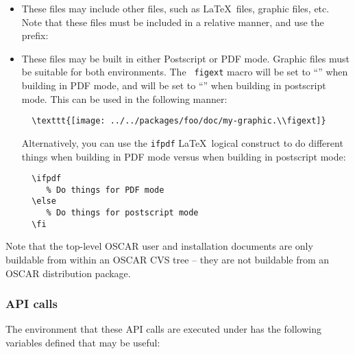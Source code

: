 \begin{itemize}
\item These files may include other files, such as \LaTeX\ files,
  graphic files, etc.  Note that these files must be included in a
  relative manner, and use the prefix: 

  \vspace{10pt}
  \centerline{}
  
\item These files may be built in either Postscript or PDF mode.
  Graphic files must be suitable for both environments.  The {\tt
    figext} macro will be set to ``'' when building in PDF
  mode, and will be set to ``'' when building in postscript
  mode.  This can be used in the following manner:

\begin{verbatim}
  \texttt{[image: ../../packages/foo/doc/my-graphic.\\figext]}
\end{verbatim}
  
  Alternatively, you can use the {\tt ifpdf} \LaTeX\ logical construct
  to do different things when building in PDF mode versus when
  building in postscript mode:

\begin{verbatim}
  \ifpdf
     % Do things for PDF mode
  \else
     % Do things for postscript mode
  \fi
\end{verbatim}

\end{itemize}

Note that the top-level OSCAR user and installation documents are only
buildable from within an OSCAR CVS tree -- they are not buildable from
an OSCAR distribution package.


\subsubsection{API calls}
\label{sec:design-pkg-api}

The environment that these API calls are executed under has the 
following variables defined that may be useful:

